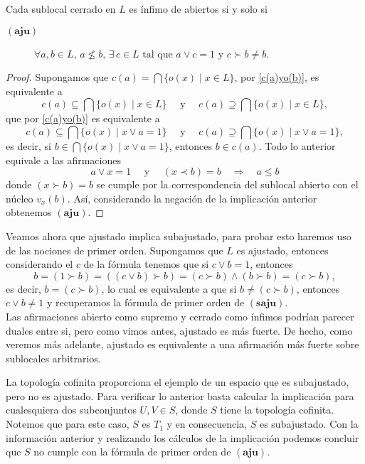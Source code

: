 \begin{thm}\label{Teorema 4.4.1}
    Cada sublocal cerrado en $L$ es ínfimo de abiertos si y solo si 
    \begin{description}
        \item[$(\mathbf{aju})$] $\forall a, b\in L,\, a\nleq b,\, \exists\, c\in L\mbox{ tal que }a\vee c=1 \mbox{ y }c\succ b\neq b$.
    \end{description}
\end{thm}

\begin{proof}
    Supongamos que $c(a)=\bigcap\{o(x)\mid x\in L\}$, por \ref{c(a)yo(b)}, es equivalente a 
    \[
    c(a)\subseteq\bigcap\{o(x)\mid x\in L\}\quad \mbox{ y }\quad c(a)\supseteq\bigcap\{o(x)\mid x\in L\},
    \] 
    que por \ref{c(a)yo(b)} es equivalente a
    \[
    c(a)\subseteq\bigcap\{o(x)\mid x\vee a=1\}\quad \mbox{ y }\quad c(a)\supseteq\bigcap\{o(x)\mid x\vee a=1\},
    \]
    es decir, si $b\in \bigcap\{o(x)\mid x\vee a=1\}$, entonces $b\in c(a)$. Todo lo anterior equivale a las afirmaciones
    \[
    a\vee x=1\quad \mbox{ y }\quad(x\prec b)=b\quad \Rightarrow \quad a\leq b
    \]
    donde $(x\succ b)=b$ se cumple por la correspondencia del sublocal abierto con el núcleo $v_x(b)$. Así, considerando la negación de la implicación anterior obtenemos $(\mathbf{aju})$.
\end{proof}

Veamos ahora que ajustado implica subajustado, para probar esto haremos uso de las nociones de primer orden. Supongamos que $L$ es ajustado, entonces considerando el $c$ de la fórmula tenemos que si $c\vee b=1$, entonces 
\[
b=(1\succ b)=((c\vee b)\succ b)=(c\succ b)\wedge(b\succ b)=(c\succ b),
\]
es decir, $b=(c\succ b)$, lo cual es equivalente a que si $b\neq (c\succ b)$, entonces $c\vee b\neq 1$ y recuperamos la fórmula de primer orden de $(\mathbf{saju})$.\\

Las afirmaciones abierto como supremo y cerrado como ínfimos podrían parecer duales entre si, pero como vimos antes, ajustado es más fuerte. De hecho, como veremos más adelante, ajustado es equivalente a una afirmación más fuerte sobre sublocales arbitrarios.

\begin{ej}\label{Saju no aju}
La topología cofinita proporciona el ejemplo de un espacio que es subajustado, pero no es ajustado. Para verificar lo anterior basta calcular la implicación para cualesquiera dos subconjuntos $U, V\in S$, donde $S$ tiene la topología cofinita. Notemos que para este caso, $S$ es $T_1$ y en consecuencia, $S$ es subajustado. Con la información anterior y realizando los cálculos de la implicación podemos concluir que $S$ no cumple con la fórmula de primer orden de $(\mathbf{aju})$.
\end{ej}

